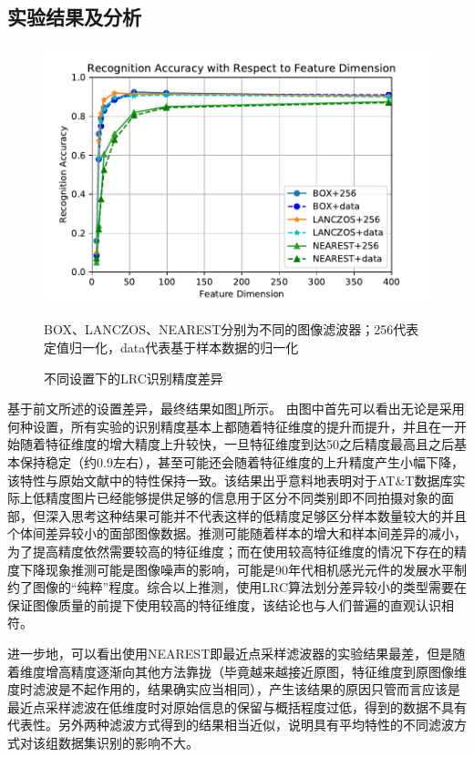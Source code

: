 \documentclass[UTF8]{ctexart}
\begin{document}
\subsection{实验结果及分析}
\begin{figure}[htbp]
    \centering
    \includegraphics[scale=0.7]{RA_Method.pdf}
    \caption{不同设置下的LRC识别精度差异}{BOX、LANCZOS、NEAREST分别为不同的图像滤波器；256代表定值归一化，data代表基于样本数据的归一化}\label{fig-result_method}
\end{figure}
基于前文所述的设置差异，最终结果如图\ref{fig-result_method}所示。
由图中首先可以看出无论是采用何种设置，所有实验的识别精度基本上都随着特征维度的提升而提升，并且在一开始随着特征维度的增大精度上升较快，一旦特征维度到达50之后精度最高且之后基本保持稳定（约0.9左右），甚至可能还会随着特征维度的上升精度产生小幅下降，该特性与原始文献中的特性保持一致。该结果出乎意料地表明对于AT\&T数据库实际上低精度图片已经能够提供足够的信息用于区分不同类别即不同拍摄对象的面部，但深入思考这种结果可能并不代表这样的低精度足够区分样本数量较大的并且个体间差异较小的面部图像数据。推测可能随着样本的增大和样本间差异的减小，为了提高精度依然需要较高的特征维度；而在使用较高特征维度的情况下存在的精度下降现象推测可能是图像噪声的影响，可能是90年代相机感光元件的发展水平制约了图像的“纯粹”程度。综合以上推测，使用LRC算法划分差异较小的类型需要在保证图像质量的前提下使用较高的特征维度，该结论也与人们普遍的直观认识相符。\par
进一步地，可以看出使用NEAREST即最近点采样滤波器的实验结果最差，但是随着维度增高精度逐渐向其他方法靠拢（毕竟越来越接近原图，特征维度到原图像维度时滤波是不起作用的，结果确实应当相同），产生该结果的原因只管而言应该是最近点采样滤波在低维度时对原始信息的保留与概括程度过低，得到的数据不具有代表性。另外两种滤波方式得到的结果相当近似，说明具有平均特性的不同滤波方式对该组数据集识别的影响不大。\par
\end{document}
